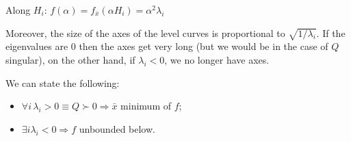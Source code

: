 \documentclass[computationalMathematics.tex]{subfiles}
\begin{document}
\begin{proposition}
Along $H_i$: $f(\alpha) = f_{\bar{x}}( \alpha H_i ) = \alpha^2 \lambda_i$
\end{proposition}

Moreover, the size of the axes of the level curves is proportional to $\sqrt{1 / \lambda_i}$.
If the eigenvalues are $0$ then the axes get very long (but we would be in the case of $Q$ singular), on the other hand, if $\lambda_i < 0$, we no longer have axes.

\begin{proposition}
We can state the following:
\begin{itemize}
  \item $\forall i \, \lambda_i > 0 \equiv Q \succ 0 \Longrightarrow \bar{x}$ minimum of $f$;
  \item $\exists i \lambda_i < 0 \Longrightarrow f$ unbounded below.
\end{itemize}
\end{proposition}
\end{document}
